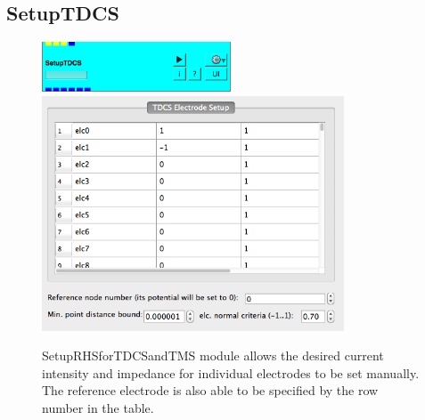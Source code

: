 \documentclass[fleqn,11pt,openany]{book}
\newcommand{\imgSm}{0.5}
\begin{document}
\subsection{SetupTDCS}
\begin{figure}[!h]
	\centering
	\includegraphics[width=\imgSm\textwidth]{BrainStimulation_figures/SetupTDCS.png}
	\includegraphics[width=0.8\textwidth]{BrainStimulation_figures/SetupTDCS_GUI.png}
	\caption{SetupRHSforTDCSandTMS module allows the desired current intensity and impedance for individual electrodes to be set manually. The reference electrode is also able to be specified by the row number in the table.}
	\label{fig:setup_rhs}
\end{figure}
\end{document}
